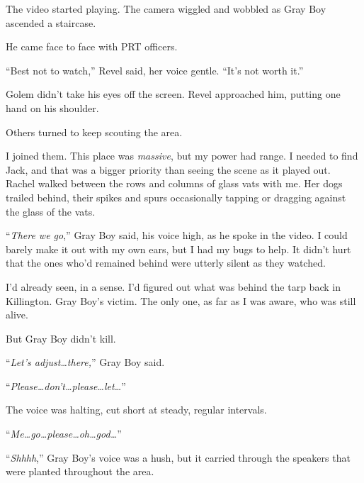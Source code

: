 The video started playing.  The camera wiggled and wobbled as Gray Boy ascended a staircase.



He came face to face with PRT officers.



``Best not to watch,'' Revel said, her voice gentle.  ``It's not worth it.''



Golem didn't take his eyes off the screen.  Revel approached him, putting one hand on his shoulder.



Others turned to keep scouting the area.



I joined them.  This place was \emph{massive}, but my power had range.  I needed to find Jack, and that was a bigger priority than seeing the scene as it played out.  Rachel walked between the rows and columns of glass vats with me.  Her dogs trailed behind, their spikes and spurs occasionally tapping or dragging against the glass of the vats.



``\emph{There we go},'' Gray Boy said, his voice high, as he spoke in the video.  I could barely make it out with my own ears, but I had my bugs to help.  It didn't hurt that the ones who'd remained behind were utterly silent as they watched.



I'd already seen, in a sense.  I'd figured out what was behind the tarp back in Killington.  Gray Boy's victim.  The only one, as far as I was aware, who was still alive.



But Gray Boy didn't kill.



``\emph{Let's adjust\ldots there,}'' Gray Boy said.



``\emph{Please\ldots don't\ldots please\ldots let\ldots}''



The voice was halting, cut short at steady, regular intervals.



``\emph{Me\ldots go\ldots please\ldots oh\ldots god\ldots}''



``\emph{Shhhh},'' Gray Boy's voice was a hush, but it carried through the speakers that were planted throughout the area.



